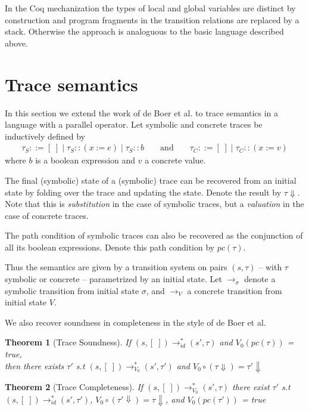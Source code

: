 \documentclass[submission,copyright,creativecommons]{eptcs}
\newtheorem{theorem}{Theorem}
\begin{document}
In the Coq mechanization the types of local and global variables are distinct by construction and program
fragments in the transition relations are replaced by a stack.
Otherwise the approach is analoguous to the basic language described above.

\section{Trace semantics}
In this section we extend the work of de Boer et al. to trace semantics in a language with a parallel operator.
Let symbolic and concrete traces be inductively defined by
\begin{align*}
  \tau_{S} ::= [\;] \mid \tau_{S} :: (x := e) \mid \tau_{S} :: b
  && \mbox{ and } &&
  \tau_{C} ::= [\;] \mid \tau_{C} :: (x := v)
\end{align*}
where $b$ is a boolean expression and $v$ a concrete value.

The final (symbolic) state of a (symbolic) trace can be recovered from an initial state by folding over
the trace and updating the state. Denote the result by $\tau\Downarrow$. Note that this is \emph{substitution}
in the case of symbolic traces, but a \emph{valuation} in the case of concrete traces.

The path condition of symbolic traces can also be recovered as the conjunction of all its boolean expressions.
Denote this path condition by $pc(\tau)$.

Thus the semantics are given by a transition system on pairs $(s, \tau)$ -- with $\tau$ symbolic or concrete --
parametrized by an initial state. Let $\rightarrow_{\sigma}$ denote a symbolic transition from initial state $\sigma$,
and $\rightarrow_{V}$ a concrete transition from initial state $V$.

We also recover soundness in completeness in the style of de Boer et al.
\begin{theorem}[Trace Soundness]
  If $(s, [\;]) \rightarrow_{id}^{*} (s', \tau)$ and $V_{0}(pc(\tau))$ = true,\\
  then there exists $\tau'$ s.t $(s, [\;]) \rightarrow_{V_0}^{*} (s', \tau')$ and
    $V_{0} \circ (\tau\Downarrow) = \tau'\Downarrow$
\end{theorem}

\begin{theorem}[Trace Completeness]
  If $(s, [\;]) \rightarrow_{V_{0}}^{*} (s', \tau)$ there exist $\tau'$ s.t \\
  $(s, [\;]) \rightarrow_{id}^{*} (s', \tau')$, $V_{0} \circ (\tau' \Downarrow) = \tau\Downarrow$,
  and $V_{0}(pc(\tau'))$ = true
\end{theorem}
\end{document}
